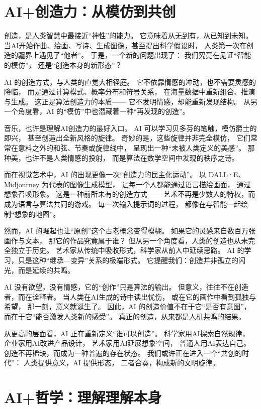 \section{AI+创造力：从模仿到共创}

创造，是人类智慧中最接近“神性”的能力。  
它意味着从无到有，从已知到未知。  
当AI开始作曲、绘画、写诗、生成图像，甚至提出科学假设时，  
人类第一次在创造的疆界上遇见了“他者”。  
于是，一个新的问题出现了：  
我们究竟在见证“智能的模仿”，  
还是“创造本身的新形态”？

AI 的创造方式，与人类的直觉大相径庭。  
它不依靠情感的冲动，也不需要灵感的降临，  
而是通过计算模式、概率分布和符号关系，  
在海量数据中重新组合、推演与生成。  
这正是算法创造力的本质——  
它不发明情感，却能重新发现结构。  
从另一个角度看，AI 的“模仿”中也潜藏着一种“再发现的创造”。

音乐，也许是理解AI创造力的最好入口。  
AI 可以学习贝多芬的笔触，模仿爵士的即兴，  
甚至创造出全新风格的旋律。  
奇妙的是，这些旋律并非完全模仿，  
它们常常在意料之外的和弦、节奏或旋律线中，  
呈现出一种“未被人类定义的美感”。  
那种美，也许不是人类情感的投射，  
而是算法在数学空间中发现的秩序之诗。

而在视觉艺术中，AI 的出现更像一次“创造力的民主化运动”。  
以 DALL·E、Midjourney 为代表的图像生成模型，  
让每一个人都能通过语言描绘画面，  
通过想象召唤形象。  
这是一种前所未有的创造方式——  
艺术不再是少数人的特权，而成为语言与算法共同的游戏。  
每一次输入提示词的过程，  
都像在与智能一起绘制“想象的地图”。

然而，AI 的崛起也让“原创”这个古老概念变得模糊。  
如果它的灵感来自数百万张画作与文本，  
那它的作品究竟属于谁？  
但从另一个角度看，人类的创造也从未完全独立于历史。  
艺术家从传统中吸收形式，科学家从前人中延续思路。  
AI 的学习，只是这种“继承—变异”关系的极端形式。  
它提醒我们：创造并非孤立的闪光，而是延续的共鸣。

AI 没有欲望，没有情感，它的“创作”只是算法的输出。  
但意义，往往不在创造者，而在诠释者。  
当人类在AI生成的诗中读出忧伤，  
或在它的画作中看到孤独与希望，  
那一刻，意义就诞生了。  
因此，AI 的创造价值不在于它“是否有意图”，  
而在于它“能否激发人类新的感受”。  
真正的创造，从来都是人机共鸣的结果。

从更高的层面看，AI 正在重新定义“谁可以创造”。  
科学家用AI探索自然规律，  
企业家用AI改进产品设计，  
艺术家用AI延展想象空间，  
普通人用AI表达自己。  
创造不再稀缺，而成为一种普遍的存在状态。  
我们或许正在进入一个“共创的时代”：  
人类提供意义，AI 提供形态，  
二者合奏，构成新的文明旋律。

\section{AI+哲学：理解理解本身}

